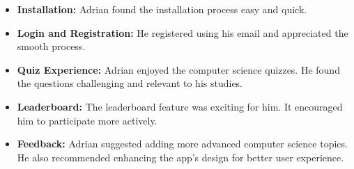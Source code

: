 \begin{itemize}
    \item \textbf{Installation:} Adrian found the installation process easy and quick.
    \item \textbf{Login and Registration:} He registered using his email and appreciated the smooth process.
    \item \textbf{Quiz Experience:} Adrian enjoyed the computer science quizzes. He found the questions challenging and relevant to his studies.
    \item \textbf{Leaderboard:} The leaderboard feature was exciting for him. It encouraged him to participate more actively.
    \item \textbf{Feedback:} Adrian suggested adding more advanced computer science topics. He also recommended enhancing the app’s design for better user experience.
\end{itemize}
